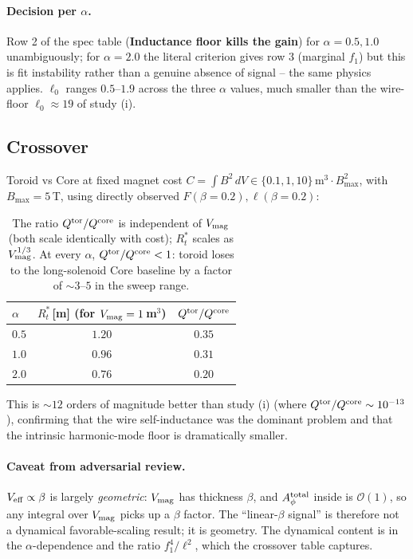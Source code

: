 \documentclass[11pt]{article}
\begin{document}
\paragraph{Decision per $\alpha$.}  Row 2 of the spec table
(\textbf{Inductance floor kills the gain}) for $\alpha=0.5,1.0$
unambiguously; for $\alpha=2.0$ the literal criterion gives row 3
(marginal $f_1$) but this is fit instability rather than a genuine
absence of signal -- the same physics applies.  $\ell_0$ ranges
$0.5$--$1.9$ across the three $\alpha$ values, much smaller than
the wire-floor $\ell_0\approx 19$ of study (i).

\subsection{Crossover}

Toroid vs Core at fixed magnet cost
$C=\int B^2\,dV\in\{0.1,1,10\}\,\mathrm m^3\cdot B_{\max}^2$, with
$B_{\max}=5$\,T, using directly observed $F(\beta=0.2),\ell(\beta=0.2)$:

\begin{table}[h]
\centering
\begin{tabular}{lc|c}\toprule
$\alpha$ & $R_t^\ast$\,[m] (for $V_{\rm mag}=1$\,m$^3$) & $Q^{\rm tor}/Q^{\rm core}$ \\\midrule
$0.5$ & $1.20$ & $0.35$ \\
$1.0$ & $0.96$ & $0.31$ \\
$2.0$ & $0.76$ & $0.20$ \\\bottomrule
\end{tabular}
\caption{The ratio $Q^{\rm tor}/Q^{\rm core}$ is independent of
$V_{\rm mag}$ (both scale identically with cost); $R_t^\ast$ scales
as $V_{\rm mag}^{1/3}$.  At every $\alpha$, $Q^{\rm tor}/Q^{\rm core}<1$:
toroid loses to the long-solenoid Core baseline by a factor of
$\sim 3$--$5$ in the sweep range.}
\label{tab:crossover-har}
\end{table}

This is $\sim 12$ orders of magnitude better than study (i)
(where $Q^{\rm tor}/Q^{\rm core}\sim 10^{-13}$), confirming that
the wire self-inductance was the dominant problem and that the
intrinsic harmonic-mode floor is dramatically smaller.

\paragraph{Caveat from adversarial review.}  $V_{\rm eff}\propto\beta$
is largely \emph{geometric}: $V_{\rm mag}$ has thickness $\beta$, and
$A_\phi^{\rm total}$ inside is $\mathcal O(1)$, so any integral over
$V_{\rm mag}$ picks up a $\beta$ factor.  The ``linear-$\beta$ signal''
is therefore not a dynamical favorable-scaling result; it is
geometry.  The dynamical content is in the $\alpha$-dependence and
the ratio $f_1^4/\ell^2$, which the crossover table captures.
\end{document}
